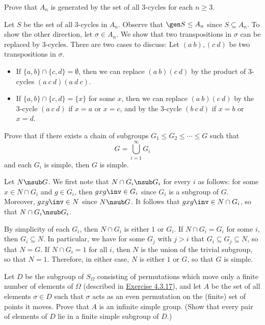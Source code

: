 \begin{exercise}\label{ex4.6.4}
	Prove that $A_n$ is generated by the set of all 3-cycles for each $n \geq 3$.
\end{exercise}

\begin{sol}
	Let $S$ be the set of all 3-cycles in $A_n$. Observe that $\gen S \leq A_n$ since $S \subseteq A_n$. To show the other direction, let $\sigma \in A_n$. We show that two transpositions in $\sigma$ can be replaced by 3-cycles. There are two cases to discuss: Let $(a\ b), (c\ d)$ be two transpositions in $\sigma$.
	\begin{itemize}
		\item If $\{a, b\} \cap \{c, d\} = \emptyset$, then we can replace $(a\ b)(c\ d)$ by the product of 3-cycles $(a\ c\ d)(a\ d\ c)$.
		\item If $\{a, b\} \cap \{c, d\} = \{x\}$ for some $x$, then we can replace $(a\ b)(c\ d)$ by the 3-cycle $(a\ c\ d)$ if $x = a$ or $x = c$, and by the 3-cycle $(b\ c\ d)$ if $x = b$ or $x = d$.
	\end{itemize}
\end{sol}

\begin{exercise}\label{ex4.6.5}
	Prove that if there exists a chain of subgroups $G_1 \leq G_2 \leq \cdots \leq G$ such that
	\[G = \bigcup_{i = 1}^\infty G_i\]
	and each $G_i$ is simple, then $G$ is simple.
\end{exercise}

\begin{sol}
	Let $N \nsub G$. We first note that $N \cap G_i \nsub G_i$ for every $i$ as follows: for some $x \in N \cap G_i$ and $g \in G_i$, then $gxg\inv \in G_i$ since $G_i$ is a subgroup of $G$. Moreover, $gxg\inv \in N$ since $N \nsub G$. It follows that $gxg\inv \in N \cap G_i$, so that $N \cap G_i \nsub G_i$.

	By simplicity of each $G_i$, then $N \cap G_i$ is either $1$ or $G_i$. If $N \cap G_i = G_i$ for some $i$, then $G_i \subseteq N$. In particular, we have for some $G_j$ with $j > i$ that $G_i \subseteq G_j \subseteq N$, so that $N = G$. If $N \cap G_i = 1$ for all $i$, then $N$ is the union of the trivial subgroup, so that $N = 1$. Therefore, in either case, $N$ is either $1$ or $G$, so that $G$ is simple.
\end{sol}

\begin{exercise}\label{ex4.6.6}
	Let $D$ be the subgroup of $S_\Omega$ consisting of permutations which move only a finite number of elements of $\Omega$ (described in \hyperref[ex4.3.17]{Exercise 4.3.17}), and let $A$ be the set of all elements $\sigma \in D$ such that $\sigma$ acts as an even permutation on the (finite) set of points it moves. Prove that $A$ is an infinite simple group. (Show that every pair of elements of $D$ lie in a finite simple subgroup of $D$.)
\end{exercise}

